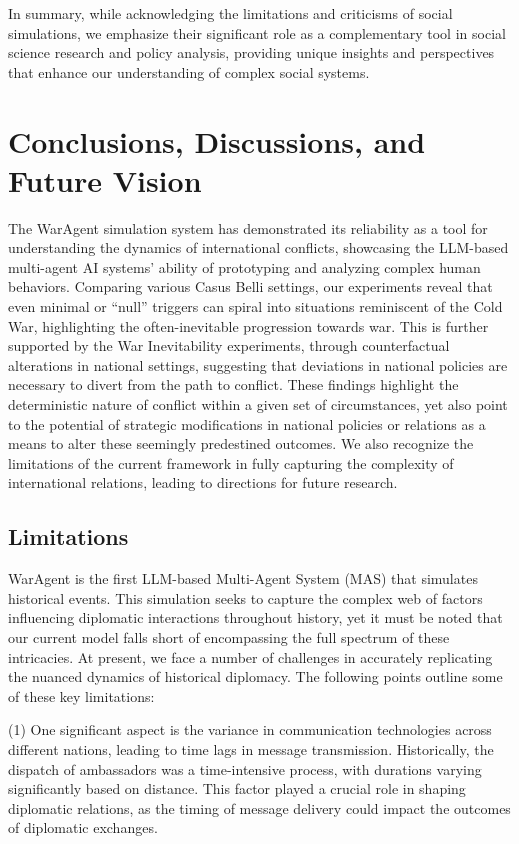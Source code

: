\documentclass{article}
\begin{document}
In summary, while acknowledging the limitations and criticisms of social simulations, we emphasize their significant role as a complementary tool in social science research and policy analysis, providing unique insights and perspectives that enhance our understanding of complex social systems.


\section{Conclusions, Discussions, and Future Vision}
The WarAgent simulation system has demonstrated its reliability as a tool for understanding the dynamics of international conflicts, showcasing the LLM-based multi-agent AI systems' ability of prototyping and analyzing complex human behaviors. Comparing various Casus Belli settings, our experiments reveal that even minimal or ``null'' triggers can spiral into situations reminiscent of the Cold War, highlighting the often-inevitable progression towards war. This is further supported by the War Inevitability experiments, through counterfactual alterations in national settings, suggesting that deviations in national policies are necessary to divert from the path to conflict. These findings highlight the deterministic nature of conflict within a given set of circumstances, yet also point to the potential of strategic modifications in national policies or relations as a means to alter these seemingly predestined outcomes. We also recognize the limitations of the current framework in fully capturing the complexity of international relations, leading to directions for future research.

\subsection{Limitations}
WarAgent is the first LLM-based Multi-Agent System (MAS) that simulates historical events. This simulation seeks to capture the complex web of factors influencing diplomatic interactions throughout history, yet it must be noted that our current model falls short of encompassing the full spectrum of these intricacies. At present, we face a number of challenges in accurately replicating the nuanced dynamics of historical diplomacy. The following points outline some of these key limitations:

(1) One significant aspect is the variance in communication technologies across different nations, leading to time lags in message transmission. Historically, the dispatch of ambassadors was a time-intensive process, with durations varying significantly based on distance. This factor played a crucial role in shaping diplomatic relations, as the timing of message delivery could impact the outcomes of diplomatic exchanges.
\end{document}
